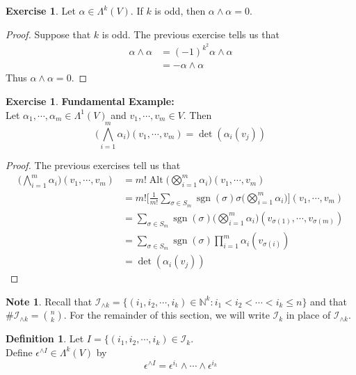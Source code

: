 \documentclass{book}
\theoremstyle{definition}
\newtheorem{defn}[definition]{Definition}
\newtheorem{note}[definition]{Note}
\newtheorem{ex}[definition]{Exercise}
\newcommand{\al}{\alpha}
\newcommand{\ep}{\epsilon}
\newcommand{\sig}{\sigma}
\newcommand{\Lam}{\Lambda}
\newcommand{\N}{\mathbb{N}}
\newcommand{\MI}{\mathcal{I}}
\DeclareMathOperator{\sgn}{sgn}
\DeclareMathOperator{\Alt}{Alt}
\DeclareMathOperator*{\0}{\mbf{0}}
\DeclareMathOperator*{\1}{\mbf{1}}
\newcommand{\tbf}[1]{\textbf{#1}}
\begin{document}
	\begin{ex}
		Let $\al \in \Lam^k(V)$. If $k$ is odd, then $\al \wedge \al = 0$. 
	\end{ex}

	\begin{proof}
		Suppose that $k$ is odd. The previous exercise tells us that 
		\begin{align*}
			\al \wedge \al 
			&= (-1)^{k^2} \al \wedge \al \\
			&= -\al \wedge \al
		\end{align*}
		Thus $\al \wedge \al = 0$.
	\end{proof}
	
	\begin{ex}\tbf{Fundamental Example:}\\
		Let $\al_1, \cdots, \al_m \in \Lam^1(V)$ and $v_1, \cdots, v_m \in V$. Then $$\bigg( \bigwedge_{i=1}^m \al_i \bigg)(v_1, \cdots, v_m) = \det (\al_i (v_j))$$
	\end{ex}

	\begin{proof}
		The previous exercises tell us that
		\begin{align*}
			\bigg( \bigwedge_{i=1}^m \al_i \bigg)(v_1, \cdots, v_m)
			&= m! \Alt \bigg( \bigotimes_{i=1}^m \al_i \bigg) (v_1, \cdots, v_m) \\
			&= m! \bigg[ \frac{1}{m!} \sum_{\sig \in S_{m}} \sgn(\sig) \sig \bigg(\bigotimes_{i=1}^m \al_i \bigg) \bigg] (v_1, \cdots, v_m) \\
			&= \sum_{\sig \in S_{m}} \sgn(\sig)  \bigg(\bigotimes_{i=1}^m \al_i \bigg) (v_{\sig(1)}, \cdots, v_{\sig(m)}) \\
			&= \sum_{\sig \in S_{m}} \sgn(\sig)  \prod_{i=1}^m \al_i(v_{\sig(i)})   \\
			&= \det (\al_i (v_j))
		\end{align*}
	\end{proof}

	\begin{note}
		Recall that $\MI_{\wedge k} = \{(i_1, i_2, \cdots, i_k) \in \N^k: i_1 < i_2 < \cdots < i_k \leq n \}$ and that $\# \MI_{\wedge k} = {n \choose k}$. For the remainder of this section, we will write $\MI_k$ in place of $\MI_{\wedge k}$.
	\end{note}

	\begin{defn}
		Let $I = \{(i_1, i_2, \cdots, i_k) \in \MI_k$. \\ Define $\ep^{\wedge I} \in \Lam^k(V)$ by $$ \ep^{\wedge I} = \ep^{i_1} \wedge \cdots \wedge \ep^{i_k} $$ 
	\end{defn}
\end{document}
